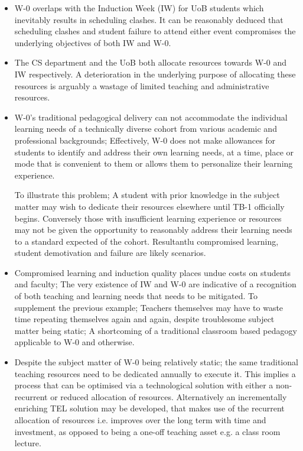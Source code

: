\begin{itemize}

    \item W-0 overlaps with the Induction Week (IW) for UoB students which inevitably results in scheduling clashes. It can be reasonably deduced that scheduling clashes and student failure to attend either event compromises the underlying objectives of both IW and W-0.
    
    \item The CS department and the UoB both allocate resources towards W-0 and IW respectively. A deterioration in the underlying purpose of allocating these resources is arguably a wastage of limited teaching and administrative resources.
    
    \newpage
    
    \item W-0's traditional pedagogical delivery can not accommodate the individual learning needs of a technically diverse cohort from various academic and professional backgrounds; Effectively, W-0 does not make allowances for students to identify and address their own learning needs, at a time, place or mode that is convenient to them or allows them to personalize their learning experience.
    
    To illustrate this problem; A student with prior knowledge in the subject matter may wish to dedicate their resources elsewhere until TB-1 officially begins. Conversely those with insufficient learning experience or  resources may not be given the opportunity to reasonably address their learning needs to a standard expected of the cohort. Resultantlu compromised learning, student demotivation and failure are likely scenarios.
    
    \item Compromised learning and induction quality places undue costs on students and faculty; The very existence of IW and W-0 are indicative of a recognition of both teaching and learning needs that needs to be mitigated. To supplement the previous example; Teachers themselves may have to waste time repeating themselves again and again, despite troublesome subject matter being static; A shortcoming of a traditional classroom based pedagogy applicable to W-0 and otherwise.
    
    \item Despite the subject matter of W-0 being relatively static; the same traditional teaching resources need to be dedicated annually to execute it. This implies a process that can be optimised via a technological solution with either a non-recurrent or reduced allocation of resources. Alternatively an incrementally enriching TEL solution may be developed, that makes use of the recurrent allocation of resources i.e. improves over the long term with time and investment, as opposed to being a one-off teaching asset e.g. a class room lecture.
    
\end{itemize}




